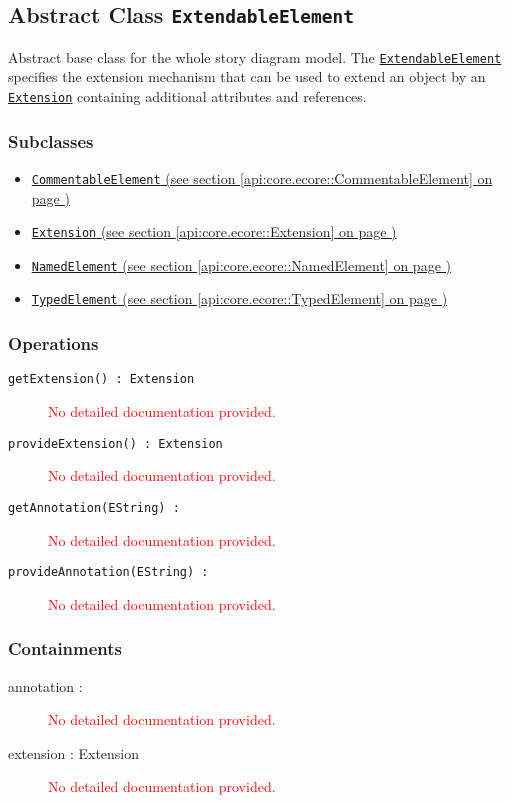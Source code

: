 \subsection{Abstract Class \texttt{ExtendableElement}}
\label{api:core.ecore::ExtendableElement}
Abstract base class for the whole story diagram model. The \hyperref[ExtendableElement]{\texttt{ExtendableElement}} specifies the extension mechanism that can be used to extend an object by an \hyperref[Extension]{\texttt{Extension}} containing additional attributes and references.
\subsubsection*{Subclasses}
\begin{itemize}
\item \hyperref[api:core.ecore::CommentableElement]{\texttt{CommentableElement} (see section \ref*{api:core.ecore::CommentableElement} on page \pageref*{api:core.ecore::CommentableElement})}
\item \hyperref[api:core.ecore::Extension]{\texttt{Extension} (see section \ref*{api:core.ecore::Extension} on page \pageref*{api:core.ecore::Extension})}
\item \hyperref[api:core.ecore::NamedElement]{\texttt{NamedElement} (see section \ref*{api:core.ecore::NamedElement} on page \pageref*{api:core.ecore::NamedElement})}
\item \hyperref[api:core.ecore::TypedElement]{\texttt{TypedElement} (see section \ref*{api:core.ecore::TypedElement} on page \pageref*{api:core.ecore::TypedElement})}
\end{itemize}
\subsubsection*{Operations}
\begin{description}
\item[\texttt{getExtension() : Extension}] \textcolor{red}{No detailed documentation provided.}
\item[\texttt{provideExtension() : Extension}] \textcolor{red}{No detailed documentation provided.}
\item[\texttt{getAnnotation(EString) : }] \textcolor{red}{No detailed documentation provided.}
\item[\texttt{provideAnnotation(EString) : }] \textcolor{red}{No detailed documentation provided.}
\end{description}
\subsubsection*{Containments}
\begin{description}
\item[annotation : ] \textcolor{red}{No detailed documentation provided.}
\item[extension : Extension] \textcolor{red}{No detailed documentation provided.}
\end{description}
